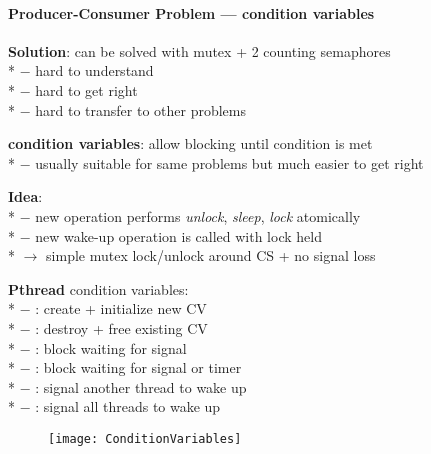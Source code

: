 \paragraph{Producer-Consumer Problem --- condition variables}
\begin{items}
  \item \textbf{Solution}: can be solved with mutex + 2 counting semaphores \\*
    $ - $ hard to understand \\*
    $ - $ hard to get right \\*
    $ - $ hard to transfer to other problems
  \item \textbf{condition variables}: allow blocking until condition is met \\*
   $ - $ usually suitable for same problems but much easier to get right
  \item \textbf{Idea}: \\*
    $ - $ new operation performs \emph{unlock}, \emph{sleep}, \emph{lock} atomically \\*
    $ - $ new wake-up operation is called with lock held \\*
    $ \to $ simple mutex lock/unlock around CS + no signal loss
  \item \textbf{Pthread} condition variables: \\*
    $ - $ : create + initialize new CV \\*
    $ - $ : destroy + free existing CV \\*
    $ - $ : block waiting for signal \\*
    $ - $ : block waiting for signal or timer \\*
    $ - $  : signal another thread to wake up \\*
    $ - $ : signal all threads to wake up
\end{items}
\begin{figure}[H]\centering\label{ConditionVariables}\texttt{[image: ConditionVariables]}\end{figure}

